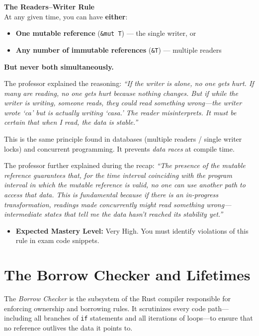 \begin{examprioritybox}
\textbf{The Readers--Writer Rule} \\
At any given time, you can have \textbf{either}:
\begin{itemize}
    \item \textbf{One mutable reference} (\texttt{\&mut T}) --- the single writer, or
    \item \textbf{Any number of immutable references} (\texttt{\&T}) --- multiple readers
\end{itemize}
\textbf{But never both simultaneously.}

The professor explained the reasoning: \emph{``If the writer is alone, no one gets hurt. If many are reading, no one gets hurt because nothing changes. But if while the writer is writing, someone reads, they could read something wrong---the writer wrote `ca' but is actually writing `casa.' The reader misinterprets. It must be certain that when I read, the data is stable.''}

This is the same principle found in databases (multiple readers / single writer locks) and concurrent programming. It prevents \emph{data races} at compile time.

The professor further explained during the recap: \emph{``The presence of the mutable reference guarantees that, for the time interval coinciding with the program interval in which the mutable reference is valid, no one can use another path to access that data. This is fundamental because if there is an in-progress transformation, readings made concurrently might read something wrong---intermediate states that tell me the data hasn't reached its stability yet.''}
\begin{itemize}
    \item \textbf{Expected Mastery Level:} Very High. You must identify violations of this rule in exam code snippets.
\end{itemize}
\end{examprioritybox}

\section{The Borrow Checker and Lifetimes}

The \emph{Borrow Checker} is the subsystem of the Rust compiler responsible for enforcing ownership and borrowing rules. It scrutinizes every code path---including all branches of \texttt{if} statements and all iterations of loops---to ensure that no reference outlives the data it points to.

